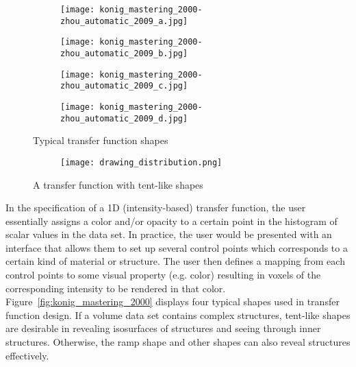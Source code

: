 \begin{figure}
\centering

\begin{subfigure}{.16\textwidth}
\texttt{[image: konig\_mastering\_2000-zhou\_automatic\_2009\_a.jpg]}
\end{subfigure}
\begin{subfigure}{.16\textwidth}
\texttt{[image: konig\_mastering\_2000-zhou\_automatic\_2009\_b.jpg]}
\end{subfigure}
\begin{subfigure}{.16\textwidth}
\texttt{[image: konig\_mastering\_2000-zhou\_automatic\_2009\_c.jpg]}
\end{subfigure}
\begin{subfigure}{.16\textwidth}
\texttt{[image: konig\_mastering\_2000-zhou\_automatic\_2009\_d.jpg]}
\end{subfigure}
\caption{Typical transfer function shapes \cite{konig_mastering_2000}}
\label{fig:konig_mastering_2000}
\begin{subfigure}{.3\textwidth}
\centering
\texttt{[image: drawing\_distribution.png]}
\end{subfigure}
\caption{A transfer function with tent-like shapes}
\label{fig:drawing_distribution}
\end{figure}

In the specification of a 1D (intensity-based) transfer function, the user essentially assigns a color and/or opacity to a certain point in the histogram of scalar values in the data set. In practice, the user would be presented with an interface that allows them to set up several control points which corresponds to a certain kind of material or structure. The user then defines a mapping from each control points to some visual property (e.g. color) resulting in voxels of the corresponding intensity to be rendered in that color.
Figure~\ref{fig:konig_mastering_2000} displays four typical shapes used in transfer function design.
If a volume data set contains complex structures, tent-like shapes are desirable in revealing isosurfaces of structures and seeing through inner structures. Otherwise, the ramp shape and other shapes can also reveal structures effectively.%

